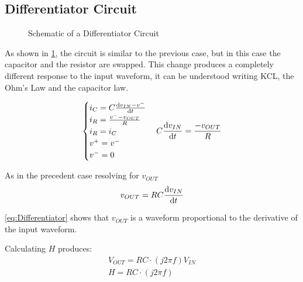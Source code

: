 \documentclass[a4paper,twocolumn]{article}
\begin{document}
\subsection{Differentiator Circuit}

\begin{figure}
    \centering
    \def \svgwidht{\columnwidth}
    
    \label{fig:DifferScheme}
    \caption{Schematic of a Differentiator Circuit}
\end{figure}

As shown in \ref{fig:DifferScheme}, the circuit is similar to the previous case, but in this case the capacitor and the resistor are swapped. This change produces a completely different response to the input waveform, it can be understood writing KCL, the Ohm's Law and the capacitor law.

\begin{gather*}
    \begin{cases}
        i_C = C\dv{v_{IN}-v^-}{t}\\
        i_R = \frac{v^--v_{OUT}}{R}\\
        i_R = i_C\\
        v^+=v^-\\
        v^-=0
    \end{cases}
    C\dv{v_{IN}}{t}=\frac{-v_{OUT}}{R}
\end{gather*}

As in the precedent case resolving for $v_{OUT}$
\begin{equation}
\label{eq:Differentiator}
    v_{OUT}=RC\dv{v_{IN}}{t}
\end{equation}

\eqref{eq:Differentiator} shows that $v_{OUT}$ is a waveform proportional to the derivative of the input waveform. 

Calculating \(H\) produces:
\begin{gather}
    V_{OUT}=RC\cdot(j2\pi f)V_{IN}\\
    H = RC\cdot(j2\pi f)
\end{gather}
\end{document}
